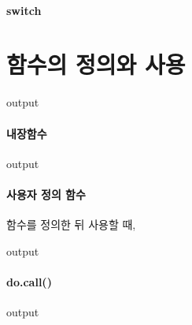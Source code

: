 \documentclass{report}
\begin{document}
\paragraph{switch}
\begin{Schunk}
\begin{Soutput}

\end{Soutput}
\end{Schunk}

\section{함수의 정의와 사용}
\begin{Schunk}
\begin{Soutput}
output
\end{Soutput}
\end{Schunk}

\paragraph{내장함수}
\begin{Schunk}
\begin{Soutput}
output
\end{Soutput}
\end{Schunk}

\paragraph{사용자 정의 함수}

함수를 정의한 뒤 사용할 때, 
\begin{Schunk}
\begin{Soutput}
output
\end{Soutput}
\end{Schunk}

\paragraph{do.call()}
\begin{Schunk}
\begin{Soutput}
output
\end{Soutput}
\end{Schunk}
\end{document}
